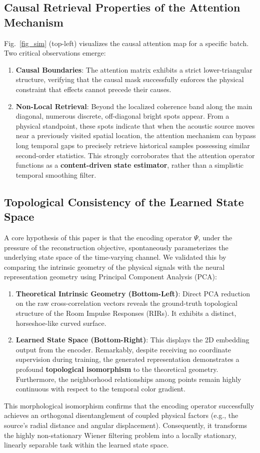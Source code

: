 \documentclass[conference]{IEEEtran}
\begin{document}
\subsection{Causal Retrieval Properties of the Attention Mechanism}
Fig.~\ref{fig_sim} (top-left) visualizes the causal attention map for a specific batch. Two critical observations emerge:
\begin{enumerate}
    \item \textbf{Causal Boundaries}: The attention matrix exhibits a strict lower-triangular structure, verifying that the causal mask successfully enforces the physical constraint that effects cannot precede their causes.
    \item \textbf{Non-Local Retrieval}: Beyond the localized coherence band along the main diagonal, numerous discrete, off-diagonal bright spots appear. From a physical standpoint, these spots indicate that when the acoustic source moves near a previously visited spatial location, the attention mechanism can bypass long temporal gaps to precisely retrieve historical samples possessing similar second-order statistics. This strongly corroborates that the attention operator functions as a \textbf{content-driven state estimator}, rather than a simplistic temporal smoothing filter.
\end{enumerate}

\subsection{Topological Consistency of the Learned State Space}
A core hypothesis of this paper is that the encoding operator $\Psi$, under the pressure of the reconstruction objective, spontaneously parameterizes the underlying state space of the time-varying channel. We validated this by comparing the intrinsic geometry of the physical signals with the neural representation geometry using Principal Component Analysis (PCA):
\begin{enumerate}
    \item \textbf{Theoretical Intrinsic Geometry (Bottom-Left)}: Direct PCA reduction on the raw cross-correlation vectors reveals the ground-truth topological structure of the Room Impulse Responses (RIRs). It exhibits a distinct, horseshoe-like curved surface.
    \item \textbf{Learned State Space (Bottom-Right)}: This displays the 2D embedding output from the encoder. Remarkably, despite receiving no coordinate supervision during training, the generated representation demonstrates a profound \textbf{topological isomorphism} to the theoretical geometry. Furthermore, the neighborhood relationships among points remain highly continuous with respect to the temporal color gradient.
\end{enumerate}
This morphological isomorphism confirms that the encoding operator successfully achieves an orthogonal disentanglement of coupled physical factors (e.g., the source's radial distance and angular displacement). Consequently, it transforms the highly non-stationary Wiener filtering problem into a locally stationary, linearly separable task within the learned state space.
\end{document}
